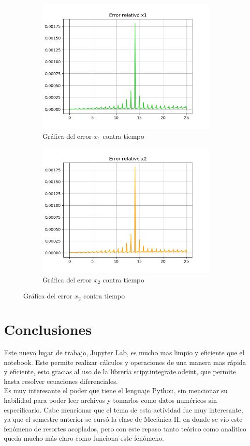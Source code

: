 \documentclass[12pt]{article}
\begin{document}
\begin{figure}[h!]
\begin{subfigure}{.6\textwidth}
  \centering
  \includegraphics[width=.6\linewidth]{Ej2_23.png}
  \caption{Gráfica del error $x_1$ contra tiempo}
  \label{fig:sfig2}
\end{subfigure}
\begin{subfigure}{.6\textwidth}
  \centering
  \includegraphics[width=.6\linewidth]{Ej2_24.png}
  \caption{Gráfica del error $x_2$ contra tiempo}
  \label{fig:sfig2}
\end{subfigure}
\end{figure}

\section{Conclusiones}
Este nuevo lugar de trabajo, Jupyter Lab, es mucho mas limpio y eficiente que el notebook. Este permite realizar cálculos y operaciones de una manera mas rápida y eficiente, esto gracias al uso de la librería scipy.integrate.odeint, que permite hasta resolver ecuaciones diferenciales. \\

Es muy interesante el poder que tiene el lenguaje Python, sin mencionar su habilidad para poder leer archivos y tomarlos como datos numéricos sin especificarlo. Cabe mencionar que el tema de esta actividad fue muy interesante, ya que el semestre anterior se cursó la clase de Mecánica II, en donde se vio este fenómeno de resortes acoplados, pero con este repaso tanto teórico como analítico queda mucho más claro como funciona este fenómeno. 
\end{document}
